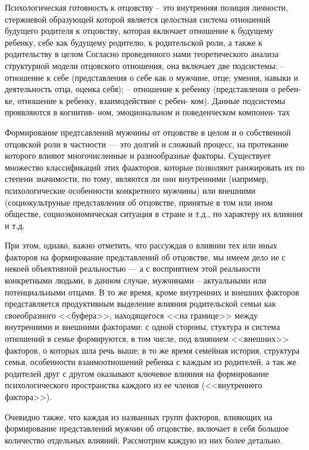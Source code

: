 \documentclass{../../common/thesisbyxetex}
\begin{document}
Психологическая готовность к отцовству – это внутренняя позиция личности,
стержневой образующей которой является целостная система отношений будущего
родителя к отцовству, которая включает отношение к будущему ребенку, себе как
будущему родителю, к родительской роли, а также к родительству в целом \cite[121]{har} Согласно
проведенного нами теоретического
анализа структурной модели отцовского отношения,
она включает две подсистемы:
– отношение к себе (представления о себе как
о мужчине, отце; умения, навыки и деятельность
отца, оценка себя);
– отношение к ребенку (представления о ребен-
ке, отношение к ребенку, взаимодействие с ребен-
ком).
Данные подсистемы проявляются в когнитив-
ном, эмоциональном и поведенческом компонен-
тах \cite[40]{otage}

Формирование предтсавлений мужчины от отцовстве в целом и о собственной отцовской роли в частности
--- это долгий и сложный процесс, на протекание которого влияют многочисленные и разнообразные
факторы. Существует множество классификаций этих фаакторов, которые позволяют ранжировать их по
степени значимости, по тому, являются ли они внутренними (например, психологические особенности
конкретного мужчины) или внешними  (социокультруные представления об отцовстве, принятые в том
или ином обществе, социоэкономическая ситуация в стране и т.д., по характеру их влияния и т.д.

При этом, однако, важно отметить, что рассуждая о влиянии тех или иных факторов на формирование
представлений об отцовстве, мы имеем дело не с некоей объективной реальностью --- а с восприятием
этой реальности конкретными людьми, в данном случае, мужчинами -- актуальными или потенциальными
отцами. В то же время, кроме внутренних и внешних факторов представляется продуктивным выделение
влияния родительской семьи как своеобразного <<буфера>>, находящегося <<на границе>>
между внутренними и внешними факторами: с одной стороны, стуктура и система отношений в семье
формируются, в том числе, под влиянием <<внешних>> факторов, о которых шла речь выше; в то же
время семейная история, структура семья, особенности взаимоотношений ребенка с каждым из
родителей, а так же родителей друг с другом оказывают ключевое влияния на формирование
психологического пространства каждого из ее членов (<<внутреннего фактора>>).

Очевидно также, что каждая из названных групп факторов, влияющих на формирование представлений
мужчин об отцовстве, включает в себя большое количество отдельных влияний. Рассмотрим каждую из них
более детально.
\end{document}
